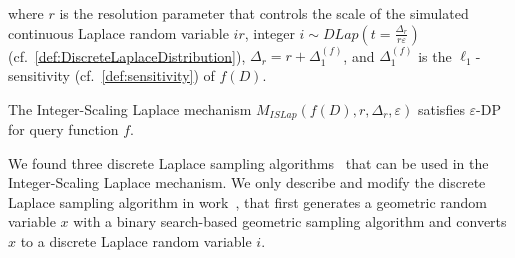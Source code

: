 where $r$ is the resolution parameter that controls the scale of the simulated continuous Laplace random variable $ir$, integer $i \sim DLap\left(t=\frac{\Delta_r}{r\varepsilon}\right) $ (cf.~\autoref{def:DiscreteLaplaceDistribution}), $\Delta _r=r+\Delta^{\left(f\right) }_1$, and $\Delta^{\left(f\right) }_1$ is the $\ell_1$-sensitivity (cf.~\autoref{def:sensitivity}) of $f\left(D\right)$.

\begin{theorem}
    The Integer-Scaling Laplace mechanism $M_{ISLap}\left(f\left(D\right),r,\Delta _r,\varepsilon\right)$ satisfies $\varepsilon$-DP for query function $f$.
\end{theorem}

We found three discrete Laplace sampling algorithms~\cite{eigner2014differentially,googleDP2019,canonne2020discrete} that can be used in the Integer-Scaling Laplace mechanism.
We only describe and modify the discrete Laplace sampling algorithm in work~\cite{googleDP2019}, that first generates a geometric random variable $x$ with a binary search-based geometric sampling algorithm and converts $x$ to a discrete Laplace random variable $i$.






